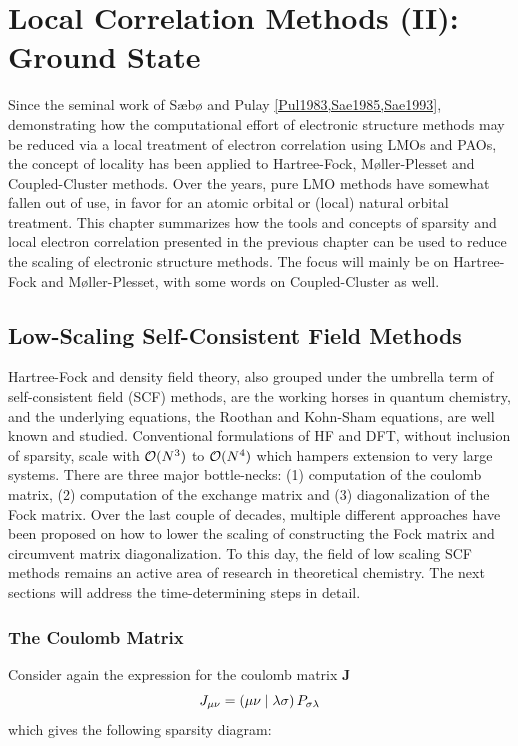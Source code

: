 \chapter{Local Correlation Methods (II): Ground State \label{cha:LOCAL1}}

Since the seminal work of S{\ae}b{\o} and Pulay \ref{Pul1983,Sae1985,Sae1993}, demonstrating how the computational effort of electronic structure methods may be reduced via a local treatment of electron correlation using LMOs and PAOs, the concept of locality has been applied to Hartree-Fock, M{\o}ller-Plesset and Coupled-Cluster methods. Over the years, pure LMO methods have somewhat fallen out of use, in favor for an atomic orbital or (local) natural orbital treatment. This chapter summarizes how the tools and concepts of sparsity and local electron correlation presented in the previous chapter can be used to reduce the scaling of electronic structure methods. The focus will mainly be on Hartree-Fock and M{\o}ller-Plesset, with some words on Coupled-Cluster as well.

\section{Low-Scaling Self-Consistent Field Methods}

Hartree-Fock and density field theory, also grouped under the umbrella term of self-consistent field (SCF) methods, are the working horses in quantum chemistry, and the underlying equations, the Roothan and Kohn-Sham equations, are well known and studied. Conventional formulations of HF and DFT, without inclusion of sparsity, scale with $\mathcal{O}(N^{3})$ to $\mathcal{O}(N^{4})$ which hampers extension to very large systems. There are three major bottle-necks: (1) computation of the coulomb matrix, (2) computation of the exchange matrix and (3) diagonalization of the Fock matrix. Over the last couple of decades, multiple different approaches have been proposed on how to lower the scaling of constructing the Fock matrix and circumvent matrix diagonalization. To this day, the field of low scaling SCF methods remains an active area of research in theoretical chemistry. The next sections will address the time-determining steps in detail.

\subsection{The Coulomb Matrix}

Consider again the expression for the coulomb matrix $\mathbf{J}$ 
\begin{equation}
J_{\mu\nu} = \left( \mu\nu \mid \lambda\sigma \right) P_{\sigma\lambda}
\end{equation}
\noindent which gives the following sparsity diagram:

